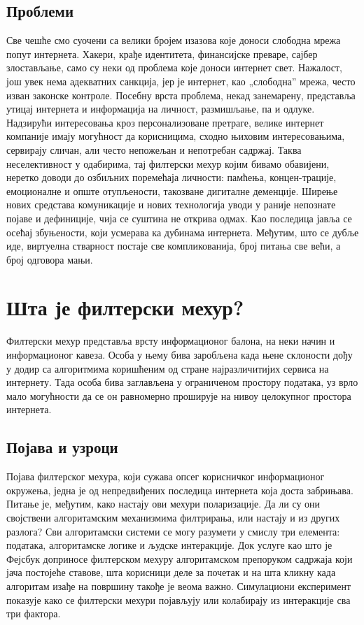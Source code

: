 \documentclass[a4paper]{article}
\begin{document}
\subsection{Проблеми}
\label{subsec:podnaslov2}

Све чешће смо суочени са велики бројем изазова које доноси слободна мрежа попут интернета. Хакери, крађе идентитета, финансијске преваре, сајбер злостављање, само су неки од проблема које доноси интернет свет. Нажалост, још увек нема адекватних санкција, јер је интернет, као „слободна” мрежа, често изван законске контроле.
Посебну врста проблема, некад занемарену, представља утицај интернета и информација на личност, размишљање, па и одлуке. Надзирући интересовања кроз персонализоване претраге, велике интернет компаније имају могућност да корисницима, сходно њиховим интересовањима, сервирају сличан, али често непожељан и непотребан садржај. Таква неселективност у одабирима, тај филтерски мехур којим бивамо обавијени, неретко доводи до озбиљних поремећаја личности: памћења, концен-трације, емоционалне и опште отупљености, такозване дигиталне деменције.
Ширење нових средстава комуникације и нових технологија уводи у раније непознате појаве и дефиниције, чија се суштина не открива одмах. Као последица јавља се осећај збуњености, који усмерава ка дубинама интернета. Међутим, што се дубље иде, виртуелна стварност постаје све компликованија, број питања све већи, а број одговора мањи.


\newpage
\section{Шта је филтерски мехур?}
\label{sec:naslov2}

Филтерски мехур представља врсту информационог балона, на неки начин и информационог кавеза. Особа у њему бива заробљена када њене склоности дођу у додир са алгоритмима коришћеним од стране најразличитијих сервиса на интернету. Тада особа бива заглављена у ограниченом простору података, уз врло мало могућности да се он равномерно проширује на нивоу целокупног простора интернета.

\subsection{Појава и узроци}
\label{subsec:podnaslov3}

Појава филтерског мехура, који сужава опсег корисничког информационог окружења, једна је од непредвиђених последица интернета која доста забрињава. Питање је, међутим, како настају ови мехури поларизације. Да ли су они својствени алгоритамским механизмима филтрирања, или настају и из других разлога? Сви алгоритамски системи се могу разумети у смислу три елемента: података, алгоритамске логике и људске интеракције. Док услуге као што је Фејсбук доприносе филтерском мехуру алгоритамском препоруком садржаја који јача постојеће ставове, шта корисници деле за почетак и на шта кликну када алгоритам изађе на површину такође је веома важно. Симулациони експеримент показује како се филтерски мехури појављују или колабирају из интеракције сва три фактора.
\end{document}

